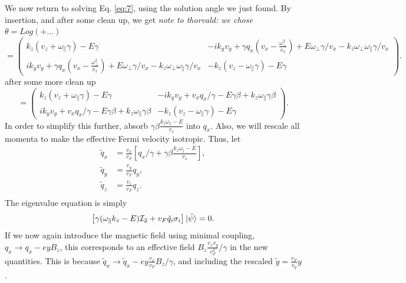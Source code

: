 We now return to solving Eq. \eqref{eq:7}, using the solution angle we just found.
By insertion, and after some clean up, we get
\emph{note to thorvald: we chose \(\theta = Log \left(+ \dots\right) \)}
\begin{equation}
  \label{eq:16}
  =
  \begin{pmatrix}
    k_z (v_{z} + \omega_{\parallel} \gamma) - E \gamma   & -i k_{y} v_{y} + \gamma q_{x} (v_{x} - \frac{\omega_{\perp}^{2}}{v_{x}}) + E \omega_{\perp} \gamma /v_{x} - k_{z} \omega _{\perp} \omega _{\parallel} \gamma /v_{x}\\
    i k_{y} v_{y} + \gamma q_{x} (v_{x} - \frac{\omega_{\perp}^{2}}{v_{x}}) + E \omega_{\perp} \gamma /v_{x} - k_{z} \omega _{\perp} \omega _{\parallel} \gamma  / v_{x}
    & -k_{z} (v_{z} - \omega_{\parallel} \gamma) - E \gamma
  \end{pmatrix}.
\end{equation}
after some more clean up
\begin{equation}
  \label{eq:17}
  =
  \begin{pmatrix}
    k_z (v_{z} + \omega_{\parallel} \gamma) - E \gamma   & -i k_{y} v_{y} + v_{x} q_{x} / \gamma  - E  \gamma \beta  + k_{z} \omega _{\parallel} \gamma \beta \\
    i k_{y} v_{y} + v_{x} q_{x} / \gamma  - E  \gamma \beta  + k_{z} \omega _{\parallel} \gamma \beta
    & -k_{z} (v_{z} - \omega_{\parallel} \gamma) - E \gamma
  \end{pmatrix}.
\end{equation}
In order to simplify this further, absorb \(\gamma \beta \frac{k_{z} \omega_{\parallel} - E}{v_{x}}\) into \(q_{x}\).
Also, we will rescale all momenta to make the effective Fermi velocity isotropic.
Thus, let
\begin{equation}
  \begin{split}
    \tilde{q}_{x} &= \frac{v_{x}}{v_{F}} \left[  q_{x} / \gamma + \gamma \beta \frac{k_{z} \omega_{\parallel} - E}{v_{x}} \right],\\
    \tilde{q}_{y} &= \frac{v_{y}}{v_{F}} q_{y},\\
    \tilde{q}_{z} &= \frac{v_{z}}{v_{F}} q_{z}.\\
  \end{split}
\end{equation}
The eigenvalue equation is simply
\begin{equation}
  \label{eq:18}
  \left[  \gamma (\omega_{\parallel} k_{z} - E) \mathcal{I}_{2} +
  v_{F} \tilde{q}_{i} \sigma _{i} \right] \ket{\tilde{\psi}}= 0.
\end{equation}
If we now again introduce the magnetic field using minimal coupling, \(q_{x} \to  q_{x} - ey B_{z} \), this corresponds to an effective field \(B_{z} \frac{v_{x} v_{y}}{v_{F}^2} / \gamma \) in the new quantities.
This is because \(\tilde{q}_{x} \to  \tilde{q}_{x} - e y \frac{v_{x}}{v_{F}}  B_{z} /\gamma \), and including the rescaled \(\tilde{y} = \frac{v_{F}}{v_{y}} y\).

